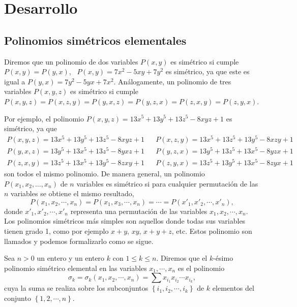 \section{Desarrollo}

\subsection{Polinomios simétricos elementales}

Diremos que un polinomio de dos variables $P(x,y)$ es simétrico si cumple $P(x, y) = P(y, x)$, \eg\, $P(x,y) = 7x^2 - 5xy + 7y^2$ es simétrico, ya que este es igual a $P(y, x) = 7y^2 - 5yx + 7x^2$.
Análogamente, un polinomio de tres variables $P(x, y, z)$ es simétrico si cumple $P(x, y, z) = P(x, z, y) = P(y, x, z) = P(y, z, x) = P(z, x, y) = P(z, y, x)$.

Por ejemplo, el polinomio $P(x, y, z) = 13x^5 + 13y^5 + 13z^5 - 8xyz + 1$ es simétrico, ya que
\begin{align*}
    P(x, y, z) = 13x^5 + 13y^5 + 13z^5 - 8xyz + 1 &&
    P(x, z, y) = 13x^5 + 13z^5 + 13y^5 - 8xzy + 1\\
    P(y, x, z) = 13y^5 + 13x^5 + 13z^5 - 8yxz + 1 &&
    P(y, z, x) = 13y^5 + 13z^5 + 13x^5 - 8yzx + 1\\
    P(z, x, y) = 13z^5 + 13x^5 + 13y^5 - 8zxy + 1 &&
    P(z, y, x) = 13z^5 + 13y^5 + 13x^5 - 8zyx + 1
\end{align*}
son todos el mismo polinomio.
De manera general, un polinomio $P(x_1, x_2, \dots, x_n)$ de $n$ variables es simétrico si para cualquier permutación de las $n$ variables se obtiene el mismo resultado, \ie
\[
    P(x_1, x_2, \cdots, x_n) = P(x_1, x_3, \cdots, x_n) = \cdots = P(x'_1, x'_2, \cdots, x'_n),
\]
donde $x'_1, x'_2, \cdots, x'_n$ representa una permutación de las variables $x_1, x_2, \cdots, x_n$.
Los polinomios simétricos más simples son aquellos donde todas sus variables tienen grado 1, como por ejemplo $x + y$, $xy$, $x + y + z$, etc.
Estos polinomio son llamados  y podemos formalizarlo como se sigue.

\begin{definition}
    Sea $n > 0$ un entero y un entero $k$ con $1 \leq k \leq n$.
    Diremos que el $k$-ésimo polinomio simétrico elemental en las variables $x_1, \cdots, x_n$ es el polinomio
    \[
        \sigma_k = \sigma_k(x_1, x_2, \cdots, x_n) = \sum x_{i_1} x_{i_2} \cdots x_{i_k},
    \]
    cuya la suma se realiza sobre los subconjuntos $\left\{ i_1, i_2, \cdots, i_k \right\}$ de $k$ elementos del conjunto $\left\{ 1, 2, \cdots, n\right\}$.
\end{definition}


